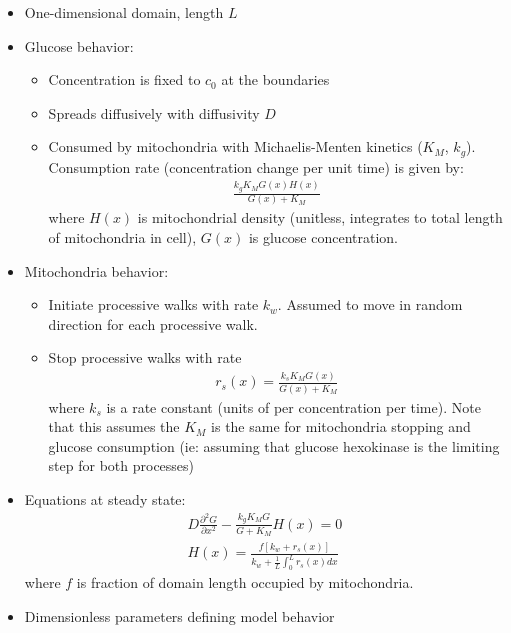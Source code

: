 \documentclass[12pt,letterpaper]{article}
\begin{document}
\begin{itemize}
	\item One-dimensional domain, length $L$
	\item Glucose behavior:
	\begin{itemize}
		\item Concentration is fixed to $c_0$ at the boundaries
		\item Spreads diffusively with diffusivity $D$
		\item Consumed by mitochondria with Michaelis-Menten kinetics ($K_M$, $k_g$). Consumption rate (concentration change per unit time) is given by:
		\begin{equation*}
		\begin{split}
		\frac{k_g K_M G(x) H(x) }{G(x)+K_M}
		\end{split}
		\end{equation*}
		where $H(x)$ is mitochondrial density (unitless, integrates to total length of mitochondria in cell), $G(x)$ is glucose concentration.
	\end{itemize}
	\item Mitochondria behavior:
	\begin{itemize}
		\item Initiate processive walks with rate $k_w$. Assumed to move in random direction for each processive walk.
		\item Stop processive walks with rate
		\begin{equation*}
		\begin{split}
		r_s(x) = \frac{k_s K_M G(x) }{G(x)+K_M}
		\end{split}
		\end{equation*}
		where $k_s$ is a rate constant (units of per concentration per time). Note that this assumes the $K_M$ is the same for mitochondria stopping and glucose consumption (ie: assuming that glucose hexokinase is the limiting step for both processes)		
	\end{itemize}
	\item Equations at steady state:
	\begin{equation*}
	\begin{split}
	D\frac{\partial^2 G}{\partial x^2} - \frac{k_g K_M G}{G+K_M} H(x) = 0 \\
	H(x) = \frac{f\left[k_w + r_s(x)\right]}{k_w + \frac{1}{L}\int_0^L r_s(x) dx } 
	\end{split}
	\end{equation*}		
	where $f$ is fraction of domain length occupied by mitochondria.
	\item Dimensionless parameters defining model behavior

\end{itemize}
\end{document}
